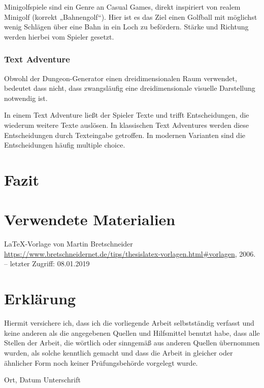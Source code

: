 Minigolfspiele sind ein Genre an Casual Games, direkt inspiriert von realem Minigolf (korrekt „Bahnengolf“). Hier ist es das Ziel einen Golfball mit möglichst wenig Schlägen über eine Bahn in ein Loch zu befördern. Stärke und Richtung werden hierbei vom Spieler gesetzt. 


\subsection{Text Adventure}

Obwohl der Dungeon-Generator einen dreidimensionalen Raum verwendet, bedeutet dass nicht, dass zwangsläufig eine dreidimensionale visuelle Darstellung notwendig ist.

In einem Text Adventure ließt der Spieler Texte und trifft Entscheidungen, die wiederum weitere Texte auslösen. In klassischen Text Adventures werden diese Entscheidungen durch Texteingabe getroffen. In modernen Varianten sind die Entscheidungen häufig multiple choice.



\chapter{Fazit}\label{c.zusammenfassung}



\chapter{Verwendete Materialien}

\LaTeX -Vorlage von Martin Bretschneider 
\newblock \url{https://www.bretschneidernet.de/tips/thesislatex-vorlagen.html#vorlagen}, 2006. --
\newblock letzter Zugriff: 08.01.2019

\label{m.tuer}




\chapter{Erklärung}

Hiermit versichere ich, dass ich die vorliegende Arbeit selbstständig verfasst und keine anderen als die angegebenen Quellen und Hilfsmittel benutzt habe, dass alle Stellen der Arbeit, die wörtlich oder sinngemäß aus anderen Quellen übernommen wurden, als solche kenntlich gemacht und dass die Arbeit in gleicher oder ähnlicher Form noch keiner Prüfungsbehörde vorgelegt wurde.

\vspace{3cm}
Ort, Datum \hspace{5cm} Unterschrift \\

